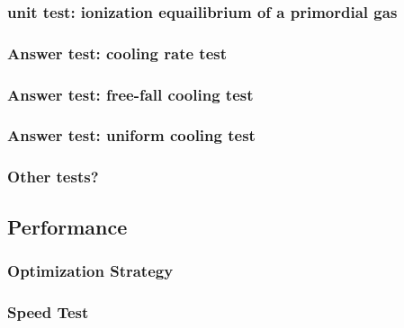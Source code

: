 \subsubsection{unit test: ionization equailibrium of a primordial gas}
\label{sec:primordial-test}

\subsubsection{Answer test: cooling rate test}
\label{sec:cooling-rate-test}

\subsubsection{Answer test: free-fall cooling test}
\label{sec:free-fall-test}

\subsubsection{Answer test: uniform cooling test}
\label{sec:uniform-cooling-test}

\subsubsection{Other tests?}


\subsection{Performance}


\subsubsection{Optimization Strategy}


\subsubsection{Speed Test}
